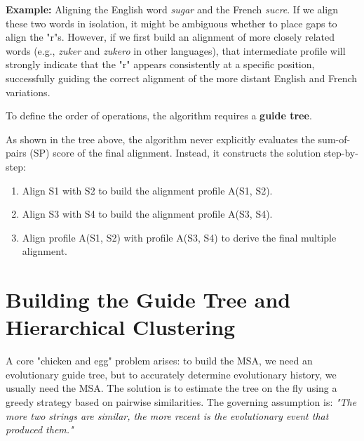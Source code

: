 \documentclass[11pt, a4paper]{article}
\begin{document}
\textbf{Example:} Aligning the English word \textit{sugar} and the French \textit{sucre}.
If we align these two words in isolation, it might be ambiguous whether to place gaps to align the "r"s. However, if we first build an alignment of more closely related words (e.g., \textit{zuker} and \textit{zukero} in other languages), that intermediate profile will strongly indicate that the "r" appears consistently at a specific position, successfully guiding the correct alignment of the more distant English and French variations.

To define the order of operations, the algorithm requires a \textbf{guide tree}. 

\begin{center}
\end{center}

As shown in the tree above, the algorithm never explicitly evaluates the sum-of-pairs (SP) score of the final alignment. Instead, it constructs the solution step-by-step:
\begin{enumerate}
    \item Align S1 with S2 to build the alignment profile A(S1, S2).
    \item Align S3 with S4 to build the alignment profile A(S3, S4).
    \item Align profile A(S1, S2) with profile A(S3, S4) to derive the final multiple alignment.
\end{enumerate}

\section{Building the Guide Tree and Hierarchical Clustering}

A core "chicken and egg" problem arises: to build the MSA, we need an evolutionary guide tree, but to accurately determine evolutionary history, we usually need the MSA. The solution is to estimate the tree on the fly using a greedy strategy based on pairwise similarities. The governing assumption is: \textit{"The more two strings are similar, the more recent is the evolutionary event that produced them."}
\end{document}
